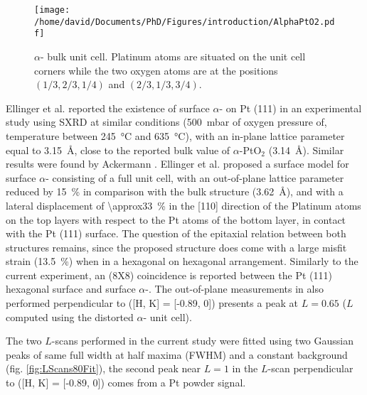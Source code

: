 \begin{SCfigure}
    \centering
    \texttt{[image: /home/david/Documents/PhD/Figures/introduction/AlphaPtO2.pdf]}
    \caption{
        $\alpha$- bulk unit cell.
        Platinum atoms are situated on the unit cell corners while the two oxygen atoms are at the positions $(1/3, 2/3, 1/4)$ and $(2/3, 1/3, 3/4)$.
    }
    \label{fig:AlphaPtO2}
\end{SCfigure}

Ellinger et al. \parencite*{Ellinger2008} reported the existence of surface $\alpha$- on Pt (111) in an experimental study using SXRD at similar conditions (\qty{500}{\milli\bar} of oxygen pressure of, temperature between \qty{245}{\degreeCelsius} and \qty{635}{\degreeCelsius}), with an in-plane lattice parameter equal to \qty{3.15}{\angstrom}, close to the reported bulk value of $\alpha$-PtO$_2$ (\qty{3.14}{\angstrom}).
Similar results were found by Ackermann \parencite*{Ackermann2007}.
Ellinger et al. \parencite*{Ellinger2008} proposed a surface model for surface $\alpha$- consisting of a full unit cell, with an out-of-plane lattice parameter reduced by \qty{15}{\percent} in comparison with the bulk structure (\qty{3.62}{\angstrom}), and with a lateral displacement of \qty{\approx33}{\percent} in the [110] direction of the Platinum atoms on the top layers with respect to the Pt atoms of the bottom layer, in contact with the Pt (111) surface.
The question of the epitaxial relation between both structures remains, since the proposed structure does come with a large misfit strain (\qty{13.5}{\percent}) when in a hexagonal on hexagonal arrangement.
Similarly to the current experiment, an (8X8) coincidence is reported between the Pt (111) hexagonal surface and surface $\alpha$-.
The out-of-plane measurements in \cite{Ellinger2008} also performed perpendicular to ([H, K] = [-0.89, 0]) presents a peak at $L=0.65$ ($L$ computed using the distorted $\alpha$- unit cell).

The two $L$-scans performed in the current study were fitted using two Gaussian peaks of same full width at half maxima (FWHM) and a constant background (fig. \ref{fig:LScans80Fit}), the second peak near $L=1$ in the $L$-scan perpendicular to ([H, K] = [-0.89, 0]) comes from a Pt powder signal.

